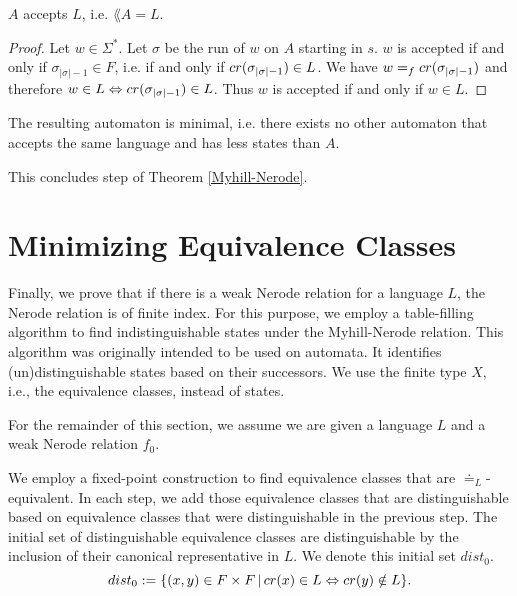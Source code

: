 \begin{theorem}
    \label{nerode_to_dfa_correct}
    $A$ accepts $L$, i.e. $\lang{A} = L$.
\end{theorem}
\begin{proof}
    Let $w \in \Sigma^*$. Let $\sigma$ be the run of $w$ on $A$ starting in $s$. 
    $w$ is accepted if and only if $\sigma_{|\sigma|-1} \in F$, i.e. if and only if $cr(\sigma_{|\sigma|-1}) \in L$.
    We have $w =_f cr(\sigma_{|\sigma|-1})$ and therefore $w \in L \Leftrightarrow cr(\sigma_{|\sigma|-1}) \in L$.
    Thus $w$ is accepted if and only if $w \in L$.
\end{proof}

The resulting automaton is minimal, i.e. there exists no other automaton that accepts the same language and has less states than $A$.

This concludes step  of Theorem \ref{Myhill-Nerode}.

\section{Minimizing Equivalence Classes}
Finally, we prove that if there is a weak Nerode relation for a language $L$, the Nerode relation is of finite index.
For this purpose, we employ a table-filling algorithm \cite{Huffman1954161} to find indistinguishable states under the Myhill-Nerode relation. 
This algorithm was originally intended to be used on automata. 
It identifies (un)distinguishable states based on their successors.
We use the finite type $X$, i.e., the equivalence classes, instead of states.


For the remainder of this section, we assume we are given a language $L$ and a weak Nerode relation $f_0$. 


We employ a fixed-point construction to find equivalence classes that are $\doteq_L$-equivalent.
In each step, we add those equivalence classes that are distinguishable based on equivalence classes that were distinguishable in the previous step.
The initial set of distinguishable equivalence classes are distinguishable by the inclusion of their canonical representative in $L$. 
We denote this initial set $\mathit{dist_0}$.
\begin{equation*}
    dist_0 := \{ (x,y)  \in F \times F \, | \, cr(x) \in L \Leftrightarrow cr(y) \notin L\}.
\end{equation*}

